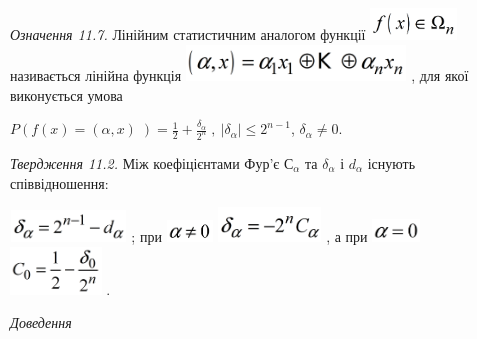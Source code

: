 \textit{Означення 11.7.}\textit{ } Лінійним статистичним аналогом функції 
\includegraphics[width=0.9098in,height=0.3354in]{crypt-img/crypt-img271.png} 
називається лінійна функція 
\includegraphics[width=2.2984in,height=0.3764in]{crypt-img/crypt-img272.png} ,
для якої виконується умова 

 ${P(f(x)=(\alpha ,x)\;)=\frac{1}{2}+\frac{\delta _{{\alpha
}}}{2^{{n}}}\;,\ |\delta _{{\alpha }}|\le 2^{{n-1}}}$,   ${\delta _{{\alpha
}}\neq 0\text{.}}$

\textit{Твердження 11.2.}\textit{ } Між коефіцієнтами  Фур’є  
${\text{С}_{{\alpha }}}$ та  ${\delta _{{\alpha }}}$  і   ${d_{{\alpha }}}$
існують співвідношення: 

 \includegraphics[width=1.2154in,height=0.3346in]{crypt-img/crypt-img273.png} ; 
при 
\includegraphics[width=0.4862in,height=0.2311in]{crypt-img/crypt-img274.png} 
\includegraphics[width=1.0791in,height=0.3646in]{crypt-img/crypt-img275.png} ,
а при 
\includegraphics[width=0.4965in,height=0.2409in]{crypt-img/crypt-img276.png}  
\includegraphics[width=0.9543in,height=0.5in]{crypt-img/crypt-img277.png} .

{\itshape
Доведення}

